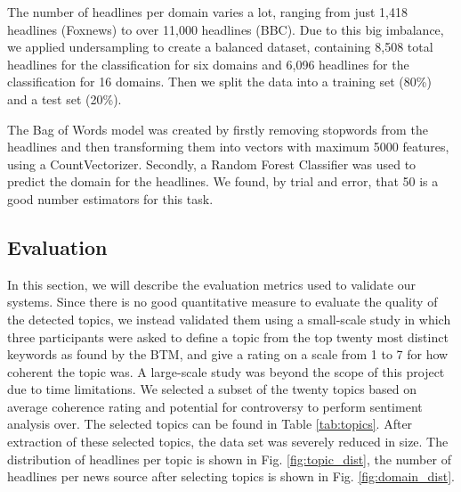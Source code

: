 \documentclass[final]{ieee}
\begin{document}
The number of headlines per domain varies a lot, ranging from just 1,418 headlines (Foxnews) to over 11,000 headlines (BBC). Due to this big imbalance, we applied undersampling to create a balanced dataset, containing 8,508 total headlines for the classification for six domains and 6,096 headlines for the classification for 16 domains. Then we split the data into a training set (80\%) and a test set (20\%).

The Bag of Words model was created by firstly removing stopwords from the headlines and then transforming them into vectors with maximum 5000 features, using a CountVectorizer. Secondly, a Random Forest Classifier was used to predict the domain for the headlines. We found, by trial and error, that 50 is a good number estimators for this task.

\subsection{Evaluation}\label{sec:evaluation}

In this section, we will describe the evaluation metrics used to validate our systems. Since there is no good quantitative measure to evaluate the quality of the detected topics, we instead validated them using a small-scale study in which three participants were asked to define a topic from the top twenty most distinct keywords as found by the BTM, and give a rating on a scale from 1 to 7 for how coherent the topic was. A large-scale study was beyond the scope of this project due to time limitations. We selected a subset of the twenty topics based on average coherence rating and potential for controversy to perform sentiment analysis over. The selected topics can be found in Table \ref{tab:topics}. After extraction of these selected topics, the data set was severely reduced in size. The distribution of headlines per topic is shown in Fig. \ref{fig:topic_dist}, the number of headlines per news source after selecting topics is shown in Fig. \ref{fig:domain_dist}.
\end{document}
